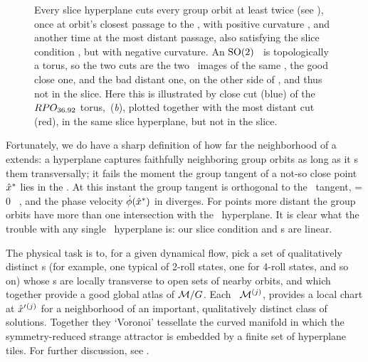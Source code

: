 \begin{figure}
   \centering
   \caption{\label{fig:sliceimage}
      Every slice hyperplane cuts every group orbit at least twice (see
      ), once at       orbit's closest passage to the
      {\template}, with positive curvature ,   and another
      time at the most distant passage, also satisfying the slice
      condition , but with negative curvature. An
      $\textrm{SO}(2)$ \rpo\ is topologically a torus, so the two cuts are the
      two \po\ images of the same \rpo, the good close one, and the bad
      distant one, on the other side of {\sset}, and thus not in the
      slice. Here this is illustrated by close cut (blue) of the \rpo\
      $RPO_{36.92}$ torus, \,({\it b}),
      plotted together with the most distant cut (red), in the same slice
      hyperplane, but not in the slice.
   }
\end{figure}


Fortunately, we do have a sharp definition of how far the neighborhood
of a {\template} extends:
a hyperplane captures faithfully neighboring group orbits as long
as it \slice s them transversally; it fails the moment the group tangent of
a not-so close point $\hat{x}^\ast$ lies in the \slice.
At this instant the group tangent is orthogonal to the \slice\ tangent,
\beq
\braket{\groupTan(\sspRSing)}{\sliceTan{}}= 0
\, ,
%
and the phase velocity $\dot{{\bf \phi}}(\hat{x}^\ast)$ in 
diverges.  For points more distant the group orbits have more than one
intersection with the \slice\ hyperplane. It is clear what the trouble
with any single \slice\ hyperplane is: our slice condition and \slice s
are linear.

The physical task is to, for a given dynamical flow, pick a set of
qualitatively distinct {\template s} (for example, one typical of 2-roll
states, one for 4-roll states, and so on) whose \slice s  are locally
transverse to open sets of nearby orbits, and which together provide a
good global atlas of ${\cal M}/G$. Each \slice\ ${\cal M}{}^{(j)}$, provides a
local chart at ${\hat{x}'}{}^{(j)}$ for a neighborhood of an important,
qualitatively distinct class of solutions. Together they `Voronoi'
tessellate  the curved manifold in which the symmetry-reduced strange
attractor is embedded by a finite set of hyperplane tiles.
For further discussion, see .

